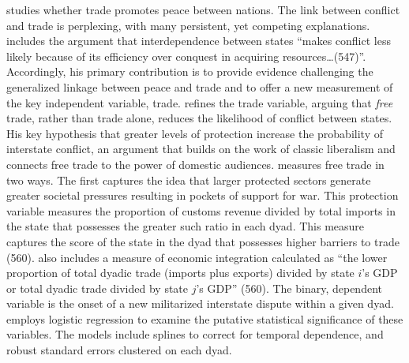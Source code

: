 \citet{mcdonald:2004} studies whether trade promotes peace between nations. The link between conflict and trade is perplexing, with many persistent, yet competing explanations. \citet{mcdonald:2004} includes the argument that interdependence between states ``makes conflict less likely because of its efficiency over conquest in acquiring resources\ldots (547)''. Accordingly, his primary contribution is to provide evidence challenging the generalized linkage between peace and trade and to offer a new measurement of the key independent variable, trade. \citet{mcdonald:2004} refines the trade variable, arguing that \textit{free} trade, rather than trade alone, reduces the likelihood of conflict between states. His key hypothesis that greater levels of protection increase the probability of interstate conflict, an argument that builds on the work of classic liberalism and connects free trade to the power of domestic audiences. \citet{mcdonald:2004} measures free trade in two ways. The first captures the idea that larger protected sectors generate greater societal pressures resulting in pockets of support for war. This protection variable measures the proportion of customs revenue divided by total imports in the state that possesses the greater such ratio in each dyad. This measure captures the score of the state in the dyad that possesses higher barriers to trade (560). \citet{mcdonald:2004} also includes a measure of economic integration  calculated as ``the lower proportion of total dyadic trade (imports plus exports) divided by state $i$'s GDP or total dyadic trade divided by state $j$'s GDP'' (560). The binary, dependent variable is the onset of a new militarized interstate dispute within a given dyad. \citet{mcdonald:2004} employs logistic regression to examine the putative statistical significance of these variables. The models include splines to correct for temporal dependence, and robust standard errors clustered on each dyad.

